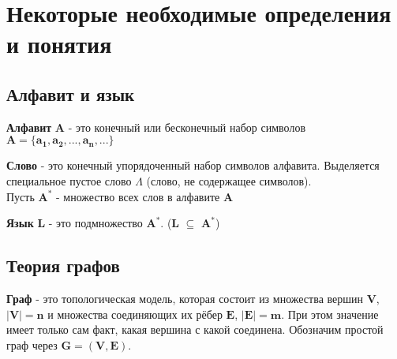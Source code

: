 


	
	\section{Некоторые необходимые определения и понятия}

    \subsection{Алфавит и язык}   

    \begin{definition}
    \textbf{Алфавит} $\boldsymbol{A}$ - это конечный или бесконечный набор символов $\boldsymbol{A = \{a_1, a_2, ... , a_n, ...\}}$
    \end{definition}  
    
    \begin{definition}
    \textbf{Слово} - это конечный упорядоченный набор символов алфавита. Выделяется специальное пустое слово \(\Lambda\) (слово, не содержащее символов).
    \\
    Пусть $\boldsymbol{A^*}$ - множество всех слов в алфавите $\boldsymbol{A}$ 
    \end{definition}
    
    \begin{definition}
    \textbf{Язык} $\boldsymbol{L}$ - это подмножество $\boldsymbol{A^*}$. ($\boldsymbol{L}$ \(\subseteq \) $\boldsymbol{A^*}$)   
    \end{definition}
    
    \begin{definition}
    
    \end{definition}  
    
    \subsection{Теория графов}
 
    
    \begin{definition}
   	\textbf{Граф} - это топологическая модель, которая состоит из множества вершин $\boldsymbol{V}$, $\boldsymbol{|V| = n}$ и множества соединяющих их рёбер $\boldsymbol{E}$, $\boldsymbol{|E| = m}$. При этом значение имеет только сам факт, какая вершина с какой соединена. Обозначим простой граф через $\boldsymbol{G = (V, E)}$.
    \end{definition}
    
   \begin{definition}
   	
   \end{definition}
    
